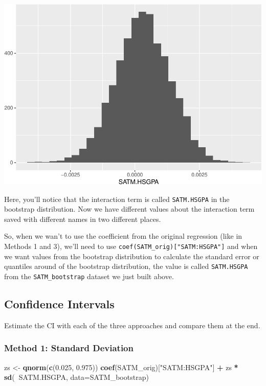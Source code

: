 \documentclass[]{article}
\newenvironment{Shaded}{\begin{snugshade}}{\end{snugshade}}
\newcommand{\DataTypeTok}[1]{\textcolor[rgb]{0.13,0.29,0.53}{#1}}
\newcommand{\FloatTok}[1]{\textcolor[rgb]{0.00,0.00,0.81}{#1}}
\newcommand{\KeywordTok}[1]{\textcolor[rgb]{0.13,0.29,0.53}{\textbf{#1}}}
\newcommand{\NormalTok}[1]{#1}
\newcommand{\OperatorTok}[1]{\textcolor[rgb]{0.81,0.36,0.00}{\textbf{#1}}}
\newcommand{\StringTok}[1]{\textcolor[rgb]{0.31,0.60,0.02}{#1}}
\begin{document}
\includegraphics{Day12_InClassLab_Answers_files/figure-latex/unnamed-chunk-3-1.pdf}

Here, you'll notice that the interaction term is called
\texttt{SATM.HSGPA} in the bootstrap distribution. Now we have different
values about the interaction term saved with different names in two
different places.

So, when we wan't to use the coefficient from the original regression
(like in Methods 1 and 3), we'll need to use
\texttt{coef(SATM\_orig){[}"SATM:HSGPA"{]}} and when we want values from
the bootstrap distribution to calculate the standard error or quantiles
around of the bootstrap distribution, the value is called
\texttt{SATM.HSGPA} from the \texttt{SATM\_bootstrap} dataset we just
built above.

\hypertarget{confidence-intervals}{%
\subsection{Confidence Intervals}\label{confidence-intervals}}

Estimate the CI with each of the three approaches and compare them at
the end.

\hypertarget{method-1-standard-deviation}{%
\subsubsection{Method 1: Standard
Deviation}\label{method-1-standard-deviation}}

\begin{Shaded}
\begin{Highlighting}[]
\NormalTok{zs <-}\StringTok{ }\KeywordTok{qnorm}\NormalTok{(}\KeywordTok{c}\NormalTok{(}\FloatTok{0.025}\NormalTok{, }\FloatTok{0.975}\NormalTok{))}
\KeywordTok{coef}\NormalTok{(SATM_orig)[}\StringTok{"SATM:HSGPA"}\NormalTok{] }\OperatorTok{+}\StringTok{ }\NormalTok{zs }\OperatorTok{*}\StringTok{ }\KeywordTok{sd}\NormalTok{(}\OperatorTok{~}\NormalTok{SATM.HSGPA, }\DataTypeTok{data=}\NormalTok{SATM_bootstrap)}
\end{Highlighting}
\end{Shaded}
\end{document}
